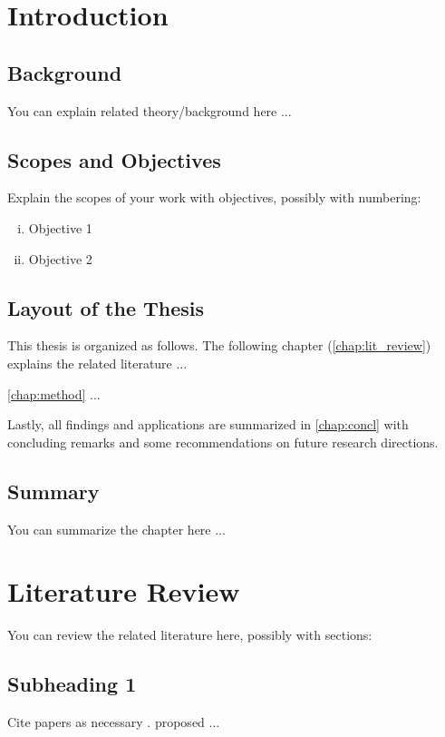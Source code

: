 \documentclass[a4paper,12pt,oneside]{book}
\begin{document}
\chapter{Introduction}\label{chap:intro}
\section{Background}\label{sec:backg}
You can explain related theory/background here ...

\section{Scopes and Objectives}
Explain the scopes of your work with objectives, possibly with numbering:

\begin{singlespacing}
\begin{enumerate}[i.]
	\item Objective 1
    \item Objective 2
\end{enumerate}
\end{singlespacing}

\section{Layout of the Thesis}
This thesis is organized as follows. The following chapter (\autoref{chap:lit_review}) explains the related literature ...

\autoref{chap:method} ...

Lastly, all findings and applications are summarized in \autoref{chap:concl} with concluding remarks and some recommendations on future research directions.

\section{Summary}
You can summarize the chapter here ...

\chapter{Literature Review}\label{chap:lit_review}
You can review the related literature here, possibly with sections:
\section{Subheading 1}
Cite papers as necessary \citep{hasan2020investigation,yaganoglu2021real}. \citet{bird2020optimisation} proposed ...
\end{document}
